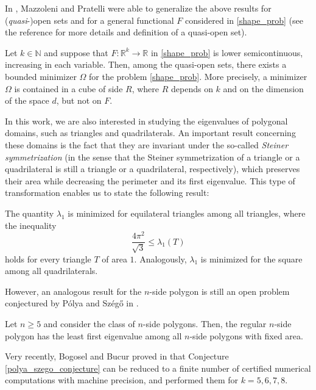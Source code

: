 In \cite{mazzoleni2013existence}, Mazzoleni and Pratelli were able to generalize the above results for (\textit{quasi}-)open sets and for a general functional \(F\) considered in \eqref{shape_prob} (see the reference for more details and definition of a quasi-open set).
\begin{theorem}
    Let \(k \in \mathbb{N}\) and suppose that \(F:\mathbb{R}^k \rightarrow \mathbb{R}\) in \eqref{shape_prob} is lower semicontinuous, increasing in each variable. Then, among the quasi-open sets, there exists a bounded minimizer \(\Omega\) for the problem \eqref{shape_prob}. More precisely, a minimizer \(\Omega\) is contained in a cube of side \(R\), where \(R\) depends on \(k\) and on the dimension of the space \(d\), but not on \(F\).
\end{theorem}

In this work, we are also interested in studying the eigenvalues of polygonal domains, such as triangles and quadrilaterals. An important result concerning these domains is the fact that they are invariant under the so-called \textit{Steiner symmetrization} (in the sense that the Steiner symmetrization of a triangle or a quadrilateral is still a triangle or a quadrilateral, respectively), which preserves their area while decreasing the perimeter and its first eigenvalue. This type of transformation enables us to state the following result:

\begin{theorem}
    The quantity \(\lambda_1\) is minimized for equilateral triangles among all triangles, where the inequality
    \[
    \frac{4 \pi^2}{\sqrt{3}} \leq  \lambda_1(T)
    \]
    holds for every triangle \(T\) of area \(1\).
    Analogously, \(\lambda_1\) is minimized for the square among all quadrilaterals.
\end{theorem}

However, an analogous result for the \(n\)-side polygon is still an open problem conjectured by Pólya and Szég\H{o} in \cite{polya1951isoperimetric}.
\begin{conjecture}\label{polya_szego_conjecture}
    Let \(n \geq 5\) and consider the class of \(n\)-side polygons. Then, the regular \(n\)-side polygon has the least first eigenvalue among all \(n\)-side polygons with fixed area.
\end{conjecture}

Very recently, Bogosel and Bucur proved in \cite{bogosel2022polygonal} that Conjecture \eqref{polya_szego_conjecture} can be reduced to a finite number of certified numerical computations with machine precision, and performed them for \(k=5, 6, 7, 8\).

